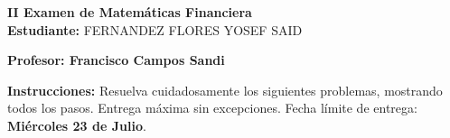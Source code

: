 \documentclass[10pt]{article}
\begin{document}
\newpage
\begin{center}
    {\LARGE \textbf{II Examen de Matemáticas Financiera}}\\[1em]
    {\large \textbf{Estudiante:} FERNANDEZ FLORES YOSEF SAID}
\end{center}

\vspace{1cm}

\textbf{Profesor: Francisco Campos Sandi}

\vspace{0.5cm}

\textbf{Instrucciones:} Resuelva cuidadosamente los siguientes problemas, mostrando todos los pasos. Entrega máxima sin excepciones. Fecha límite de entrega: \textbf{Miércoles 23 de Julio}.

\vspace{1cm}
\end{document}
